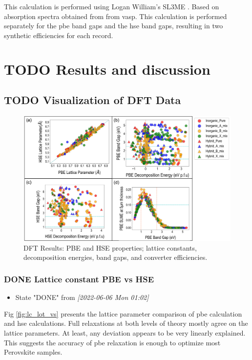 \documentclass[twoside, twocolumn, 9pt, draft]{article}
\begin{document}
This calculation is performed using Logan William's SL3ME
\cite{williams-2022-sl3me}. Based on absorption spectra obtained from
from \gls{vasp}. This calculation is performed separately for the \acrshort{pbe} band
gaps and the \acrshort{hse} band gaps, resulting in two synthetic efficiencies
for each record.

\section*{{\bfseries\sffamily TODO} Results and discussion}
\label{sec:org3eb2799}
\subsection*{{\bfseries\sffamily TODO} Visualization of DFT Data}
\label{sec:org0a3437c}
\begin{figure}
\centering
\includegraphics[width=.9\linewidth]{Figure2.png}
\caption{\label{fig:pairplots} DFT Results: PBE and HSE properties; lattice constants, decomposition energies, band gaps, and converter efficiencies.}
\end{figure}

\subsubsection*{{\bfseries\sffamily DONE} Lattice constant PBE vs HSE}
\label{sec:org9e4c9ab}
\begin{itemize}
\item State "DONE"       from              \textit{[2022-06-06 Mon 01:02]}
\end{itemize}
Fig \ref{fig:lc_lot_vs} presents the lattice parameter comparison of
\acrshort{pbe} calculation and \acrshort{hse}
calculations. Full relaxations at both levels of theory mostly agree
on the lattice parameters. At least, any deviation appears to be very
linearly explained. This suggests the accuracy of
\acrshort{pbe} relaxation is enough to optimize most Perovskite
samples.
\end{document}
